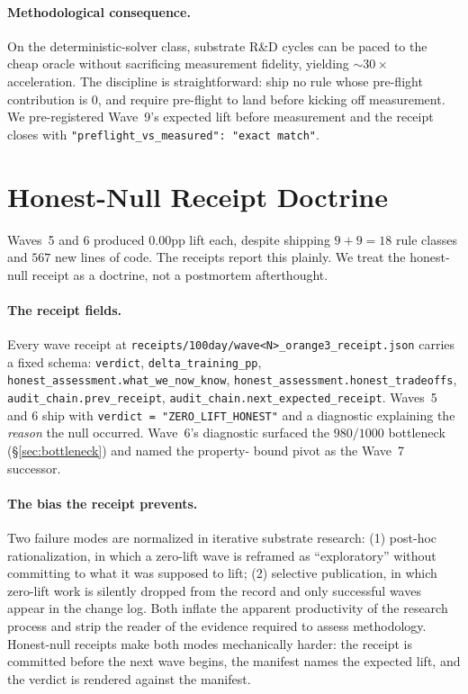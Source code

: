 \documentclass[11pt]{article}
\begin{document}
\paragraph{Methodological consequence.}
On the deterministic-solver class, substrate R\&D cycles can be paced
to the cheap oracle without sacrificing measurement fidelity, yielding
$\sim 30\times$ acceleration. The discipline is straightforward: ship no
rule whose pre-flight contribution is $0$, and require pre-flight to
land before kicking off measurement. We pre-registered Wave~9's expected
lift before measurement and the receipt closes with
\texttt{"preflight\_vs\_measured": "exact match"}.

\section{Honest-Null Receipt Doctrine}
\label{sec:honestnull}

Waves~5 and 6 produced $0.00$pp lift each, despite shipping
$9 + 9 = 18$ rule classes and $567$ new lines of code. The receipts
report this plainly. We treat the honest-null receipt as a doctrine,
not a postmortem afterthought.

\paragraph{The receipt fields.}
Every wave receipt at \texttt{receipts/100day/wave<N>\_orange3\_receipt.json}
carries a fixed schema: \texttt{verdict}, \texttt{delta\_training\_pp},
\texttt{honest\_assessment.what\_we\_now\_know},
\texttt{honest\_assessment.honest\_tradeoffs}, \texttt{audit\_chain.prev\_receipt},
\texttt{audit\_chain.next\_expected\_receipt}. Waves~5 and 6 ship with
\texttt{verdict = "ZERO\_LIFT\_HONEST"} and a diagnostic explaining the
\emph{reason} the null occurred. Wave~6's diagnostic surfaced the
$980/1000$ bottleneck (\S\ref{sec:bottleneck}) and named the property-
bound pivot as the Wave~7 successor.

\paragraph{The bias the receipt prevents.}
Two failure modes are normalized in iterative substrate research:
(1) post-hoc rationalization, in which a zero-lift wave is reframed as
``exploratory'' without committing to what it was supposed to lift;
(2) selective publication, in which zero-lift work is silently dropped
from the record and only successful waves appear in the change log.
Both inflate the apparent productivity of the research process and
strip the reader of the evidence required to assess methodology.
Honest-null receipts make both modes mechanically harder: the receipt
is committed before the next wave begins, the manifest names the
expected lift, and the verdict is rendered against the manifest.
\end{document}
